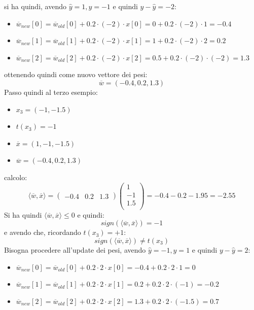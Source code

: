 \documentclass[a4paper,12pt, oneside]{book}
\begin{document}
\begin{esercizio}
  \newpage
  si ha quindi, avendo $\hat{y}=1, y=-1$ e quindi $y-\hat{y}=-2$:
  \begin{itemize}
    \item
    $\overline{w}_{new}[0]=\overline{w}_{old}[0]+0.2\cdot (-2)\cdot
    x[0]=0+0.2\cdot(-2)\cdot 1=-0.4$ 
    \item
    $\overline{w}_{new}[1]=\overline{w}_{old}[1]+0.2\cdot (-2)\cdot
    x[1]=1+0.2\cdot(-2)\cdot 2=0.2$ 
    \item
    $\overline{w}_{new}[2]=\overline{w}_{old}[2]+0.2\cdot (-2)\cdot x[2]=0.5+0.2
    \cdot(-2)\cdot(-2)=1.3$    
  \end{itemize}
  ottenendo quindi come nuovo vettore dei pesi:
  \[\overline{w}=(-0.4, 0.2, 1.3)\]
  Passo quindi al terzo esempio:
  \begin{itemize}
    \item $x_3=(-1,-1.5)$
    \item $t(x_3)=-1$
    \item $\overline{x}=(1,-1,-1.5)$
    \item $\overline{w}=(-0.4, 0.2, 1.3)$
  \end{itemize}
  calcolo:
  \[\langle \overline{w}, \overline{x}\rangle=
    \left(\begin{matrix}
        -0.4 & 0.2 & 1.3
      \end{matrix}\right)
    \left(
      \begin{matrix}
        1 \\
        -1 \\
        1.5 \\
      \end{matrix}
    \right)= -0.4-0.2-1.95 = -2.55
  \]
  Si ha quindi $\langle \overline{w}, \overline{x}\rangle \leq 0$ e quindi:
  \[sign(\langle \overline{w}, \overline{x}\rangle)=-1\]
  e avendo che, ricordando $t(x_3)=+1$:
  \[sign(\langle \overline{w}, \overline{x}\rangle)\neq t(x_3)\]
  Bisogna procedere all'update dei pesi, avendo $\hat{y}=-1, y=1$ e quindi
  $y-\hat{y}=2$:
  \begin{itemize}
    \item
    $\overline{w}_{new}[0]=\overline{w}_{old}[0]+0.2\cdot 2\cdot
    x[0]=-0.4+0.2\cdot 2\cdot 1=0$ 
    \item
    $\overline{w}_{new}[1]=\overline{w}_{old}[1]+0.2\cdot 2\cdot
    x[1]=0.2+0.2\cdot 2\cdot (-1)=-0.2$ 
    \item
    $\overline{w}_{new}[2]=\overline{w}_{old}[2]+0.2\cdot 2\cdot x[2]=1.3+0.2
    \cdot 2\cdot(-1.5)=0.7$    
  \end{itemize}

\end{esercizio}
\end{document}
